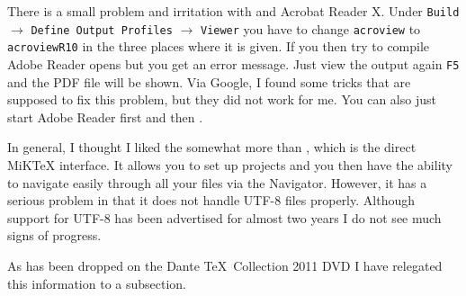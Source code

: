 There is a small problem and irritation with \TeXnicCenter and
Acrobat Reader X. Under \texttt{Build} $\to$ \texttt{Define Output
  Profiles} $\to$ \texttt{Viewer} you have to change \texttt{acroview} to
\texttt{acroviewR10} in the three places where it is given. If you
then try to compile Adobe Reader opens but you get an error
message. Just view the output again \texttt{F5} and the PDF file will
be shown. Via Google, I found some tricks that are supposed to fix
this problem, but they did not work for me. You can also just start
Adobe Reader first and then \TeXnicCenter.

In general, I thought I liked the \TeXnicCenter somewhat more than
\TeXworks, which is the direct MiK\TeX{} interface. It allows you to
set up projects and you then have the ability to navigate easily
through all your files via the Navigator. However, it has a serious
problem in that it does not handle UTF-8 files properly. Although
support for UTF-8 has been advertised for almost two years I do not
see much signs of progress.

As \TeXnicCenter has been dropped on the Dante \TeX\ Collection 2011
DVD I have relegated this information to a subsection.


